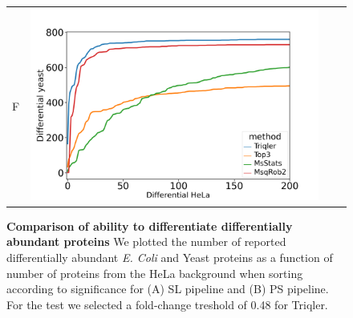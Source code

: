 \documentclass[11pt]{article}
\begin{document}
\begin{figure}[hbt]
\begin{tabular}{lclc}
        F & \includegraphics[width=0.45\linewidth]{../../result/report_plots_pipeline/diff_HeLa_vs_nonHeLa_PS_yeast.png} \\ 

    \end{tabular}
    \caption{{\bf Comparison of ability to differentiate differentially abundant proteins} We plotted the number of reported differentially abundant  {\em E. Coli} and Yeast proteins as a function of number of proteins from the HeLa background when sorting according to significance for (A) SL pipeline and (B) PS pipeline. For the test we selected a fold-change treshold of 0.48 for Triqler. \label{fig:ability_to_differentiate_differentially_abundant_specie_vs_hela}}
\end{figure}

\iffalse
\end{document}
